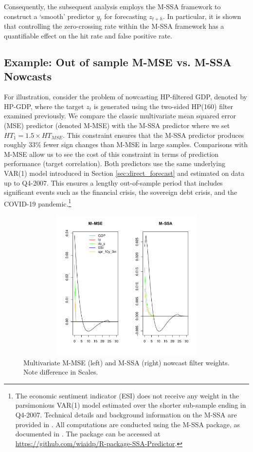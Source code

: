 \documentclass[11pt,a4paper]{article}
\begin{document}
 Consequently, the subsequent analysis employs the M-SSA framework to construct a `smooth' predictor $y_t$ for forecasting $z_{t+h}$. In particular, it is shown that controlling the zero-crossing rate within the M-SSA framework has a quantifiable effect on the hit rate and false positive rate.

 

 
 
 
 
 
 \subsection{Example: Out of sample M-MSE vs. M-SSA Nowcasts}

For illustration, consider the problem of nowcasting HP-filtered GDP, denoted by HP-GDP, where the target $z_t$ is generated using the two-sided HP(160) filter examined previously. We compare the classic multivariate mean squared error (MSE) predictor (denoted M-MSE) with the M-SSA predictor where we set $HT_1=1.5\times HT_{MSE}$. This constraint ensures that the M-SSA predictor produces roughly 33$\%$ fewer sign changes than M-MSE in large samples. Comparisons with M-MSE allow us to see the cost of this constraint in terms of prediction performance (target correlation). 
Both predictors use the same underlying VAR(1) model introduced in Section \ref{sec:direct_forecast} and estimated on data up to Q4-2007. This ensures a lengthy out-of-sample period that includes significant events such as the financial crisis, the sovereign debt crisis, and the COVID-19 pandemic.\footnote{The economic sentiment indicator (ESI) does not receive any weight in the parsimonious VAR(1) model estimated over the shorter sub-sample ending in Q4-2007. Technical details and background information on the M-SSA are provided in \cite{Wildi2025}. All computations are conducted using the M-SSA package, as documented in \cite{Wildi2025}. The package can be accessed at \url{https://github.com/wiaidp/R-package-SSA-Predictor}.}

\begin{figure}[htpb]
    \begin{center}
        \includegraphics[height=3in, width=4.5in]{./Figures/bk_gammak.pdf}
        \caption{Multivariate M-MSE (left) and M-SSA (right) nowcast filter weights.\\
        Note difference in Scales.
        \label{bk_gammak}}
    \end{center}
\end{figure}
\end{document}
